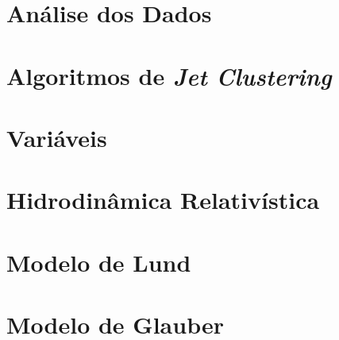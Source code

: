 \documentclass[a4paper,12pt]{article}
\begin{document}
\newpage

\section{Análise dos Dados}


\begin{appendices}

\section{Algoritmos de \emph{Jet Clustering}}\label{algoritmos}


\section{Variáveis}\label{variaveis}


\section{Hidrodinâmica Relativística}\label{hidrodinamica}


\section{Modelo de Lund}


%

\section{Modelo de Glauber}\label{glauber}


\end{appendices}

 

%
\end{document}
